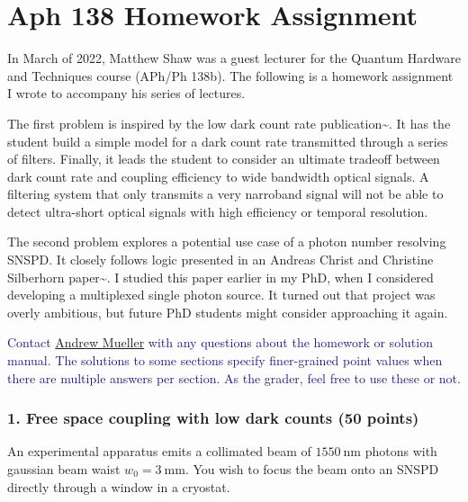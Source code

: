 \documentclass[11pt]{caltech_thesis} %
\begin{document}
\appendix

\hypertarget{aph-138-homework-assignment}{%
\chapter{Aph 138 Homework
Assignment}\label{aph-138-homework-assignment}}

In March of 2022, Matthew Shaw was a guest lecturer for the Quantum
Hardware and Techniques course (APh/Ph 138b). The following is a
homework assignment I wrote to accompany his series of lectures.

The first problem is inspired by the low dark count rate
publication\textasciitilde{}\autocite{Mueller:21}. It has the student
build a simple model for a dark count rate transmitted through a series
of filters. Finally, it leads the student to consider an ultimate
tradeoff between dark count rate and coupling efficiency to wide
bandwidth optical signals. A filtering system that only transmits a very
narroband signal will not be able to detect ultra-short optical signals
with high efficiency or temporal resolution.

The second problem explores a potential use case of a photon number
resolving SNSPD. It closely follows logic presented in an Andreas Christ
and Christine Silberhorn paper\textasciitilde{}\autocite{Andreas:12}. I
studied this paper earlier in my PhD, when I considered developing a
multiplexed single photon source. It turned out that project was overly
ambitious, but future PhD students might consider approaching it again.

\textcolor{midnightblue}{Contact
\href{mailto:andrewstermueller@gmail.com}{Andrew Mueller} with any
questions about the homework or solution manual. The solutions to some
sections specify finer-grained point values when there are multiple
answers per section. As the grader, feel free to use these or not. }

\hypertarget{free-space-coupling-with-low-dark-counts-50-points}{%
\subsection{1. Free space coupling with low dark counts (50
points)}\label{free-space-coupling-with-low-dark-counts-50-points}}

An experimental apparatus emits a collimated beam of $1550~\mathrm{nm}$
photons with gaussian beam waist $w_0 = 3~\mathrm{mm}$. You wish to
focus the beam onto an SNSPD directly through a window in a cryostat.
\end{document}
